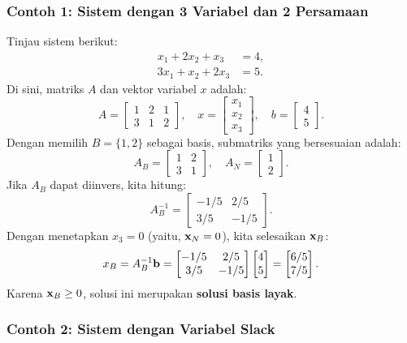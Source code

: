 \subsubsection*{Contoh 1: Sistem dengan 3 Variabel dan 2 Persamaan}

Tinjau sistem berikut:
\[
\begin{aligned}
    x_1 + 2x_2 + x_3 &= 4, \\
    3x_1 + x_2 + 2x_3 &= 5.
\end{aligned}
\]
Di sini, matriks \( A \) dan vektor variabel \( x \) adalah:
\[
A =
\begin{bmatrix}
    1 & 2 & 1 \\
    3 & 1 & 2
\end{bmatrix}, \quad
x =
\begin{bmatrix}
    x_1 \\ x_2 \\ x_3
\end{bmatrix}, \quad
b =
\begin{bmatrix}
    4 \\ 5
\end{bmatrix}.
\]
Dengan memilih \(B= \{1, 2\} \) sebagai basis, submatriks yang bersesuaian adalah:
\[
A_B =
\begin{bmatrix}
    1 & 2 \\
    3 & 1
\end{bmatrix}, \quad A_N =
\begin{bmatrix}
    1 \\
    2
\end{bmatrix}.
\]
Jika \( A_B \) dapat diinvers, kita hitung:
\[
A_B^{-1} =
\begin{bmatrix}
    -1/5 & 2/5 \\
    3/5 & -1/5
\end{bmatrix}.
\]
Dengan menetapkan \( x_3 = 0 \) (yaitu, \( \mathbf{x}_N = 0 \)), kita selesaikan \( \mathbf{x}_B \):
\[
x_B = A_B^{-1}\mathbf{b}=
\begin{bmatrix}
    -1/5 & 2/5 \\
    3/5 & -1/5
\end{bmatrix}
\begin{bmatrix}
    4 \\ 5
\end{bmatrix}
=
\begin{bmatrix}
    6/5 \\
    7/5
\end{bmatrix}.
\]
Karena \( \mathbf{x}_B \geq 0 \), solusi ini merupakan \textbf{solusi basis layak}.

\subsubsection*{Contoh 2: Sistem dengan Variabel Slack}

